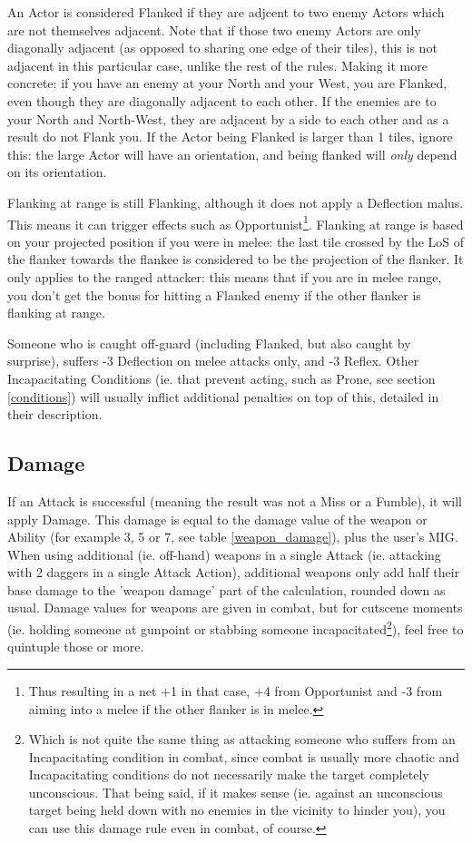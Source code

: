An Actor is considered Flanked if they are adjcent to two enemy Actors which are not themselves adjacent. Note that if those two enemy Actors are only diagonally adjacent (as opposed to sharing one edge of their tiles), this is not adjacent in this particular case, unlike the rest of the rules. Making it more concrete: if you have an enemy at your North and your West, you are Flanked, even though they are diagonally adjacent to each other. If the enemies are to your North and North-West, they are adjacent by a side to each other and as a result do not Flank you. If the Actor being Flanked is larger than 1 tiles, ignore this: the large Actor will have an orientation, and being flanked will \textit{only} depend on its orientation. 

Flanking at range is still Flanking, although it does not apply a Deflection malus. This means it can trigger effects such as Opportunist\footnote{Thus resulting in a net +1 in that case, +4 from Opportunist and -3 from aiming into a melee if the other flanker is in melee.}. Flanking at range is based on your projected position if you were in melee: the last tile crossed by the LoS of the flanker towards the flankee is considered to be the projection of the flanker. It only applies to the ranged attacker: this means that if you are in melee range, you don't get the bonus for hitting a Flanked enemy if the other flanker is flanking at range.

Someone who is caught off-guard (including Flanked, but also caught by surprise), suffers -3 Deflection on melee attacks only, and -3 Reflex. Other Incapacitating Conditions (ie. that prevent acting, such as Prone, see section \ref{conditions}) will usually inflict additional penalties on top of this, detailed in their description.


\subsection{Damage}

If an Attack is successful (meaning the result was not a Miss or a Fumble), it will apply Damage. This damage is equal to the damage value of the weapon or Ability (for example 3, 5 or 7, see table \ref{weapon_damage}), plus the user's MIG. When using additional (ie. off-hand) weapons in a single Attack (ie. attacking with 2 daggers in a single Attack Action), additional weapons only add half their base damage to the 'weapon damage' part of the calculation, rounded down as usual. Damage values for weapons are given in combat, but for cutscene moments (ie. holding someone at gunpoint or stabbing someone incapacitated\footnote{Which is not quite the same thing as attacking someone who suffers from an Incapacitating condition in combat, since combat is usually more chaotic and Incapacitating conditions do not necessarily make the target completely unconscious. That being said, if it makes sense (ie. against an unconscious target being held down with no enemies in the vicinity to hinder you), you can use this  damage rule even in combat, of course.}), feel free to quintuple those or more.

